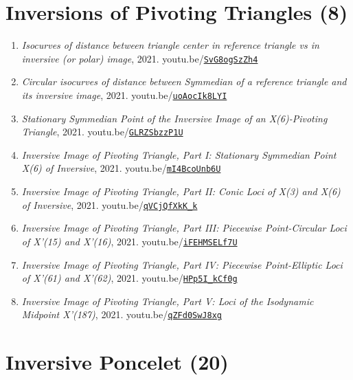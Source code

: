 \documentclass[12pt]{article}
\begin{document}
\section{Inversions of Pivoting Triangles (8)}

\begin{enumerate}[resume]
\item \textit{Isocurves of distance between triangle center in reference triangle vs in inversive (or polar) image}, 2021. youtu.be/\href{https://youtu.be/SvG8ogSzZh4}{\nolinkurl{SvG8ogSzZh4}}
\item \textit{Circular isocurves of distance between Symmedian of a reference triangle and its inversive image}, 2021. youtu.be/\href{https://youtu.be/uoAocIk8LYI}{\nolinkurl{uoAocIk8LYI}}
\item \textit{Stationary Symmedian Point of the Inversive Image of an X(6)-Pivoting Triangle}, 2021. youtu.be/\href{https://youtu.be/GLRZSbzzP1U}{\nolinkurl{GLRZSbzzP1U}}
\item \textit{Inversive Image of Pivoting Triangle, Part I: Stationary Symmedian Point X(6) of Inversive}, 2021. youtu.be/\href{https://youtu.be/mI4BcoUnb6U}{\nolinkurl{mI4BcoUnb6U}}
\item \textit{Inversive Image of Pivoting Triangle, Part II: Conic Loci of X(3) and X(6) of Inversive}, 2021. youtu.be/\href{https://youtu.be/qVCjQfXkK_k}{\nolinkurl{qVCjQfXkK\_k}}
\item \textit{Inversive Image of Pivoting Triangle, Part III: Piecewise Point-Circular Loci of X'(15) and X'(16)}, 2021. youtu.be/\href{https://youtu.be/iFEHMSELf7U}{\nolinkurl{iFEHMSELf7U}}
\item \textit{Inversive Image of Pivoting Triangle, Part IV: Piecewise Point-Elliptic Loci of X'(61) and X'(62)}, 2021. youtu.be/\href{https://youtu.be/HPp5I_kCf0g}{\nolinkurl{HPp5I\_kCf0g}}
\item \textit{Inversive Image of Pivoting Triangle, Part V: Loci of the Isodynamic Midpoint X'(187)}, 2021. youtu.be/\href{https://youtu.be/qZFd0SwJ8xg}{\nolinkurl{qZFd0SwJ8xg}}
\end{enumerate}

\section{Inversive Poncelet (20)}
\end{document}
